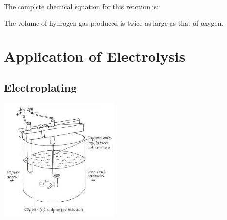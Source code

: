 \begin{multicols}{2}
\begin{description*}
{The complete chemical equation for this reaction is:\\

The volume of hydrogen gas produced is twice as large as that of oxygen.}
\end{description*}




\section*{Application of Electrolysis}


\subsection{Electroplating}

\begin{center}
\includegraphics[width=0.45\textwidth]{./img/vso/electroplating.jpg}
\end{center}


\end{multicols}
